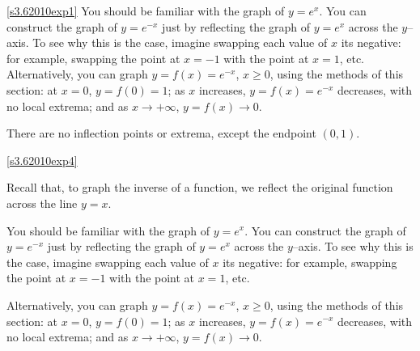 \begin{solution}
\eqref{s3.62010exp1}
You should be familiar with the graph of $y=e^x$. You can
           construct the graph of $y=e^{-x}$ just by reflecting the graph
           of $y=e^x$ across the $y$--axis. To see why this is the case,
           imagine swapping each value of $x$ its negative: for example,
                      swapping the point at $x = -1$ with the point at $x = 1$, etc.
           Alternatively, you can graph $y=f(x)=e^{-x}$, $x\ge 0$,
           using the methods of this section: at $x=0$, $y=f(0)=1$;
           as $x$ increases, $y=f(x)=e^{-x}$ decreases, with no local
           extrema; and as $x\rightarrow+\infty$, $y=f(x)\rightarrow 0$.

There are no inflection points or extrema, except the endpoint $(0,1)$.

\begin{center}\end{center}

\eqref{s3.62010exp4}

Recall that, to graph the inverse of a function, we reflect the original function across the line $y=x$.

You should be familiar with the graph of $y=e^x$. You can
           construct the graph of $y=e^{-x}$ just by reflecting the graph
           of $y=e^x$ across the $y$--axis. To see why this is the case,
           imagine swapping each value of $x$ its negative: for example,
           swapping the point at $x = -1$ with the point at $x = 1$, etc.

           Alternatively, you can graph $y=f(x)=e^{-x}$, $x\ge 0$,
           using the methods of this section: at $x=0$, $y=f(0)=1$;
           as $x$ increases, $y=f(x)=e^{-x}$ decreases, with no local
           extrema; and as $x\rightarrow+\infty$, $y=f(x)\rightarrow 0$.



\end{solution}
